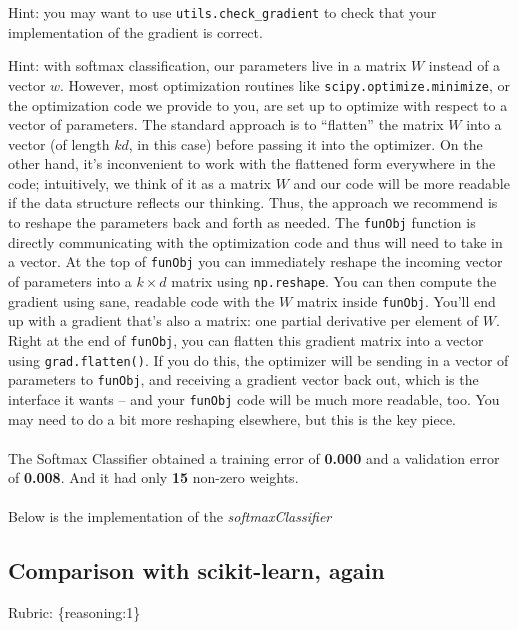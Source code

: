 \documentclass{article}
\def\rubric#1{\gre{Rubric: \{#1\}}}{}
\def\gre#1{{\color{gre}#1}}
\def\ans#1{{\color{ans}#1}}
\begin{document}
Hint: you may want to use \verb|utils.check_gradient| to check that your implementation of the gradient is correct.

Hint: with softmax classification, our parameters live in a matrix $W$ instead of a vector $w$. However, most optimization routines like \texttt{scipy.optimize.minimize}, or the optimization code we provide to you, are set up to optimize with respect to a vector of parameters. The standard approach is to ``flatten'' the matrix $W$ into a vector (of length $kd$, in this case) before passing it into the optimizer. On the other hand, it's inconvenient to work with the flattened form everywhere in the code; intuitively, we think of it as a matrix $W$ and our code will be more readable if the data structure reflects our thinking. Thus, the approach we recommend is to reshape the parameters back and forth as needed. The \texttt{funObj} function is directly communicating with the optimization code and thus will need to take in a vector. At the top of \texttt{funObj} you can immediately reshape the incoming vector of parameters into a $k \times d$ matrix using \texttt{np.reshape}. You can then compute the gradient using sane, readable code with the $W$ matrix inside \texttt{funObj}. You'll end up with a gradient that's also a matrix: one partial derivative per element of $W$. Right at the end of \texttt{funObj}, you can flatten this gradient matrix into a vector using \texttt{grad.flatten()}. If you do this, the optimizer will be sending in a vector of parameters to \texttt{funObj}, and receiving a gradient vector back out, which is the interface it wants -- and your \texttt{funObj} code will be much more readable, too. You may need to do a bit more reshaping elsewhere, but this is the key piece. \\ \\
\ans{
    The Softmax Classifier obtained a training error of \textbf{0.000} and a validation 
    error of \textbf{0.008}. And it had only \textbf{15} non-zero weights. \\ \\
    Below is the implementation of the \emph{softmaxClassifier}
}
\begin{center}
     
\end{center}

\subsection{Comparison with scikit-learn, again}
\rubric{reasoning:1}
\end{document}
